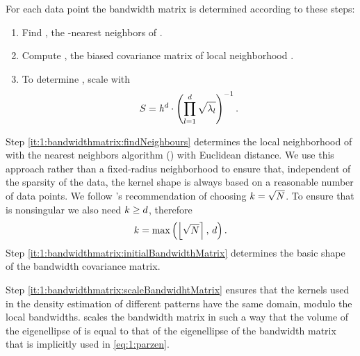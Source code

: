 	For each data point \varPattern the bandwidth matrix is determined according to these steps:
		\begin{enumerate}[labelindent=0ex]
			\item \label{it:1:bandwidthmatrix:findNeighbours}
				Find \varNeighborhood{\varPattern}, the \KNNK-nearest neighbors of \varPattern.
			\item \label{it:1:bandwidthmatrix:initialBandwidthMatrix}
				Compute \varCovarianceMatrix, the biased covariance matrix  of local neighborhood \varNeighborhood{\varPattern}.
			\item \label{it:1:bandwidthmatrix:scaleBandwidhtMatrix}
				To determine \varBandwidthMatrix, scale \varCovarianceMatrix with
				\begin{equation}\label{eq:method:scalingFactor}
					S = \mathit{h}^{d} \cdot \left({\displaystyle\prod_{l = 1}^{d} \sqrt{\lambda_{l}}}\right)^{-1}.
				\end{equation}
		\end{enumerate}	
			Step \ref{it:1:bandwidthmatrix:findNeighbours} determines the local neighborhood of \varPattern with the \KNNK nearest neighbors algorithm (\KNN) with Euclidean distance. We use this approach rather than a fixed-radius neighborhood to ensure that, independent of the sparsity of the data, the kernel shape is always based on a reasonable number of data points. 
			We follow \citeauthor{silverman1986density}'s \cite{silverman1986density} recommendation of choosing $k = \sqrt{N}$. To ensure that \varCovarianceMatrix is nonsingular we also need $k \geq d$, therefore
			\begin{equation*}
				k = \max\left(\left\lfloor \sqrt{N} \right\rceil,\, d \right).	
			\end{equation*}
			Step \ref{it:1:bandwidthmatrix:initialBandwidthMatrix} determines the basic shape of the bandwidth covariance matrix. 

			Step \ref{it:1:bandwidthmatrix:scaleBandwidhtMatrix} ensures that the kernels used in the density estimation of different patterns have the same domain, modulo the local bandwidths.  scales the bandwidth matrix in such a way that the volume of the eigenellipse of \varBandwidthMatrix is equal to that of the eigenellipse of the bandwidth matrix that is implicitly used in \cref{eq:1:parzen}. 